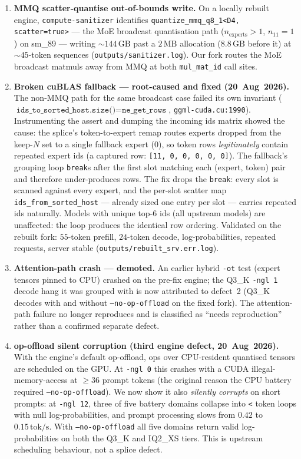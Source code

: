 \documentclass[11pt]{article}
\newcommand{\code}[1]{\texttt{#1}}
\newcommand{\gb}{\,\textrm{GB}}
\newcommand{\tps}{\,\textrm{tok/s}}
\begin{document}
\begin{enumerate}[leftmargin=1.6em]
  \item \textbf{MMQ scatter-quantise out-of-bounds write.} On a locally rebuilt
    engine, \code{compute-sanitizer} identifies
    \code{quantize\_mmq\_q8\_1<D4, scatter=true>} --- the MoE broadcast
    quantisation path ($n_{\text{experts}}>1$, $n_{11}=1$) on sm\_89 --- writing
    ${\sim}144\gb{}$ past a $2\,\textrm{MB}$ allocation ($8.8\gb{}$ before it) at
    ${\sim}45$-token sequences (\code{outputs/sanitizer.log}). Our fork routes
    the MoE broadcast matmuls away from MMQ at both \code{mul\_mat\_id} call
    sites.
  \item \textbf{Broken cuBLAS fallback --- root-caused and fixed
    (20~Aug~2026).} The non-MMQ path for the same broadcast case failed its own
    invariant ($\code{ids\_to\_sorted\_host.size()}=\code{ne\_get\_rows}$,
    \code{ggml-cuda.cu:1990}). Instrumenting the assert and dumping the incoming
    ids matrix showed the cause: the splice's token-to-expert remap routes
    experts dropped from the keep-$N$ set to a single fallback expert ($0$), so
    token rows \emph{legitimately} contain repeated expert ids (a captured row:
    \code{[11, 0, 0, 0, 0, 0]}). The fallback's grouping loop
    \code{break}s after the first slot matching each (expert, token) pair and
    therefore under-produces rows. The fix drops the \code{break}: every slot is
    scanned against every expert, and the per-slot scatter map
    \code{ids\_from\_sorted\_host} --- already sized one entry per slot ---
    carries repeated ids naturally. Models with unique top-$6$ ids (all upstream
    models) are unaffected: the loop produces the identical row ordering.
    Validated on the rebuilt fork: $55$-token prefill, $24$-token decode,
    log-probabilities, repeated requests, server stable
    (\code{outputs/rebuilt\_srv.err.log}).
  \item \textbf{Attention-path crash --- demoted.} An earlier hybrid \code{-ot}
    test (expert tensors pinned to CPU) crashed on the pre-fix engine; the
    Q3\_K \code{-ngl 1} decode hang it was grouped with is now attributed to
    defect~2 (Q3\_K decodes with and without \code{--no-op-offload} on the fixed
    fork). The attention-path failure no longer reproduces and is classified as
    ``needs reproduction'' rather than a confirmed separate defect.
  \item \textbf{op-offload silent corruption (third engine defect,
    20~Aug~2026).} With the engine's default op-offload, ops over CPU-resident
    quantised tensors are scheduled on the GPU. At \code{-ngl 0} this crashes
    with a CUDA illegal-memory-access at $\ge36$ prompt tokens (the original
    reason the CPU battery required \code{--no-op-offload}). We now show it
    also \emph{silently corrupts} on short prompts: at \code{-ngl 12}, three of
    five battery domains collapse into \code{<} token loops with null
    log-probabilities, and prompt processing slows from $0.42$ to
    $0.15\tps{}$. With \code{--no-op-offload} all five domains return valid
    log-probabilities on both the Q3\_K and IQ2\_XS tiers. This is upstream
    scheduling behaviour, not a splice defect.
\end{enumerate}
\end{document}
